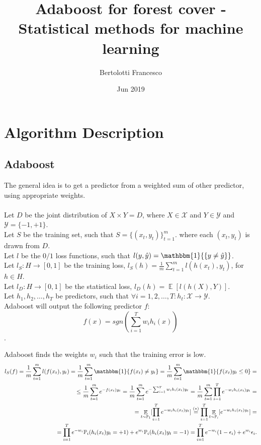\documentclass{article}
\title{Adaboost for forest cover - Statistical methods for machine learning}
\author{Bertolotti Francesco}
\date{Jun 2019} %
\DeclareMathOperator{\E}{\mathbb{E}}
\begin{document}
\maketitle

\section{Algorithm Description}
\subsection{Adaboost}

The general idea is to get a predictor from a weighted sum of other predictor, using appropriate weights.\\\\
Let $D$ be the joint distribution of $X\times Y = D$, where $X \in \mathcal{X}$ and $Y \in \mathcal{Y}$ and 
$\mathcal{Y} =\{-1,+1\}$.\\
Let $S$ be the training set, such that $S=\{(x_t,y_t)\}_{t=1}^{m}$.
where each $(x_t, y_t)$ is drawn from $D$.\\
Let $l$ be the $0/1$ loss functions, such that $l(y,\hat{y}) = \mathbbm{1}{\{y \neq \hat{y}\}}$. \\
Let $l_S:H\rightarrow[0,1]$ be the training loss, $l_S(h) = \frac{1}{m}\sum_{t=1}^{m} l(h(x_t),y_t)$,
for $h\in H$.\\
Let $l_D:H\rightarrow[0,1]$ be the statistical loss, $l_D(h) = \E [l(h(X),Y)]$.\\
Let $h_1, h_2, \dots, h_T$ be predictors, such that $\forall i=1,2,\dots,T : h_t:\mathcal{X}\rightarrow\mathcal{Y}$.\\

Adaboost will output the following predictor $f$:
$$f(x) = sgn(\sum_{i=1}^{T}w_i h_i(x))$$.

Adaboost finds the weights $w_i$ such that the training error is low.\\

\begin{align*}
l_S(f) = \frac{1}{m}\sum_{t=1}^{m}l(f(x_t),y_t) 
       = \frac{1}{m}\sum_{t=1}^{m}\mathbbm{1}\{f(x_t) \neq y_t \}
       = \frac{1}{m}\sum_{t=1}^{m}\mathbbm{1}\{f(x_t) y_t \leq 0 \} =\\
       \leq \frac{1}{m}\sum_{t=1}^{m}e^{-f(x_t)y_t}
       = \frac{1}{m}\sum_{t=1}^{m}e^{-\sum_{i=1}^{T}w_i h_i(x_t) y_t}
       = \frac{1}{m} \sum_{t=1}^{m} \prod_{i=1}^{T} e^{-w_i h_i(x_t) y_t} =\\
       = \E_{t\sim \mathbb{P}_1} [\prod_{i=1}^{T} e^{-w_i h_i(x_t) y_t}] 
       \stackrel{(*)}{=} \prod_{i=1}^{T} \E_{t\sim \mathbb{P}_i} [ e^{-w_i h_i(x_t) y_t} ] =\\
       = \prod_{i=1}^{T} e^{-w_i} \mathbb{P}_i(h_i(x_t) y_t = +1) + e^{w_i} \mathbb{P}_{i}(h_i(x_t) y_t = -1) 
       = \prod_{i=1}^{T} e^{-w_i} (1-\epsilon_i) + e^{w_i} \epsilon_i.\\
\end{align*}
\end{document}
